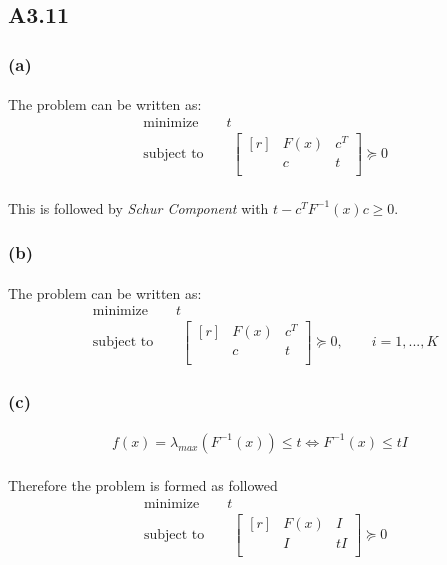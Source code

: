 \subsection*{A3.11}
\subsubsection*{(a)}
\paragraph{}
The problem can be written as:
\begin{align*}
&\text{minimize} \qquad t \\
&\text{subject to} \qquad \begin{bmatrix*}[r]
&F(x) & c^T \\ & c & t\\
\end{bmatrix*} \succeq 0
\end{align*}
\paragraph{}
This is followed by \textit{Schur Component} with $t - c^TF^{-1}(x)c \geq 0$.
\subsubsection*{(b)}
\paragraph{}
The problem can be written as:
\begin{align*}
&\text{minimize} \qquad t \\
&\text{subject to} \qquad \begin{bmatrix*}[r]
&F(x) & c^T \\ & c & t\\
\end{bmatrix*} \succeq 0, \qquad i =1,...,K
\end{align*}
\subsubsection*{(c)}
\begin{align*}
f(x) =\lambda_{max}(F^{-1}(x)) \leq t \Leftrightarrow F^{-1}(x) \leq tI
\end{align*}
\paragraph{}
Therefore the problem is formed as followed
\begin{align*}
&\text{minimize} \qquad t \\
&\text{subject to} \qquad \begin{bmatrix*}[r]
&F(x) & I \\ & I & tI \\
\end{bmatrix*} \succeq 0
\end{align*}
